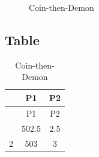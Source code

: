 \documentclass[
  10pt,
  letterpaper,
  DIV=11,
  numbers=noendperiod,
  twoside]{scrartcl}
\begin{document}
\begin{figure}


\caption{\label{fig-coin-then-demon}Coin-then-Demon}

\end{figure}%

\subsection{Table}

\begin{longtable}[]{@{}ccc@{}}
\caption{Coin-then-Demon}\label{tbl-coin-then-demon}\tabularnewline
\toprule\noalign{}
& P1 & P2 \\
\midrule\noalign{}
\endfirsthead
\toprule\noalign{}
& P1 & P2 \\
\midrule\noalign{}
\endhead
\bottomrule\noalign{}
\endlastfoot
1 & 502.5 & 2.5 \\
2 & 503 & 3 \\
\end{longtable}
\end{document}
